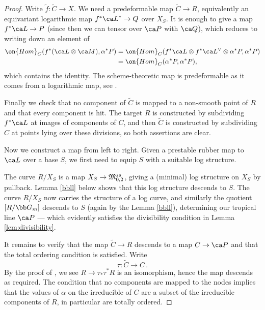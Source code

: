 \begin{proof}
Write $\tilde f\colon \tilde C \to X$.
We need a predeformable map $\tilde C \to R$, equivalently an equivariant logarithmic map $\tilde f^* {\ca L}^* \to Q$ over $X_S$. It is enough to give a map $f^*\ca L \to P$ (since then we can tensor over $\ca P$ with $\ca Q$), which reduces to writing down an element of
\begin{equation}
\begin{split}
\on{Hom}_C(f^*(\ca L \otimes \ca M), \alpha^*P) &=
\on{Hom}_C(f^*\ca L \otimes f^*\ca L^\vee \otimes \alpha^*P, \alpha^*P)\\
& = \on{Hom}_C(\alpha^*P, \alpha^*P),
\end{split}
\end{equation}
which contains the identity. The scheme-theoretic map is predeformable as it comes from a logarithmic map, see \cite{BumsigKim2008LOGARITHMICSTABLEMAPS}.



Finally we check that no component of $\tilde C$ is mapped to a non-smooth point of $R$ and that every component is hit. The target $R$ is  constructed by subdividing $f^*\ca L$ at images of components of $C$, and then $\tilde C$ is constructed by subdividing $C$ at points lying over these divisions, so both assertions are clear. %

Now we construct a map from left to right. Given a prestable rubber map to $\ca L$ over a base $S$, we first need to equip $S$ with a suitable log structure.

The curve $R/X_S$ is a map $X_S \to \frak M_{0,2}^{ss}$, giving a (minimal) log structure on $X_S$ by pullback.
Lemma \ref{bbll} below shows that this log structure descends to $S$. The curve $R/X_S$ now carries the structure of a log curve, and similarly the quotient $[R/\bb G_m]$ descends to $S$ (again by the Lemma \ref{bbll}), determining our tropical line $\ca P$ --- which evidently satisfies the divisibility condition in Lemma \ref{lem:divisibility}.

It remains to verify that the map $\tilde C \to R$ descends to a map $C \to \ca P$
and that the total ordering condition is satisfied. Write
$$\tau\colon \tilde C \to C\, .$$
By the proof of \cite[]{Marcus2017Logarithmic-com},
we see $R \to \tau_*\tau^*R$ is an isomorphism, hence the map descends as required. The condition that no components are mapped to the nodes implies that the values of $\alpha$ on the irreducible of $C$ are a subset of the irreducible components of $R$, in particular are totally ordered.
\end{proof}

